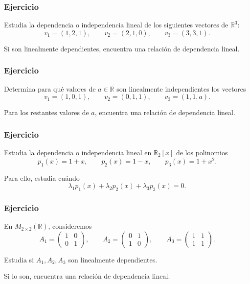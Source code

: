 \begin{frame}
    \frametitle{Ejercicio}

    Estudia la dependencia o independencia lineal de los siguientes vectores
    de \(\mathbb{R}^3\):
    \[
        v_1=(1,2,1),\qquad
        v_2=(2,1,0),\qquad
        v_3=(3,3,1).
    \]

    Si son linealmente dependientes, encuentra una relación de dependencia
    lineal.
\end{frame}


\begin{frame}
    \frametitle{Ejercicio}

    Determina para qué valores de \(a\in\mathbb{R}\) son linealmente
    independientes los vectores
    \[
        v_1=(1,0,1),\qquad
        v_2=(0,1,1),\qquad
        v_3=(1,1,a).
    \]

    Para los restantes valores de \(a\), encuentra una relación de
    dependencia lineal.
\end{frame}


\begin{frame}
    \frametitle{Ejercicio}

    Estudia la dependencia o independencia lineal en \(\mathbb{R}_2[x]\)
    de los polinomios
    \[
        p_1(x)=1+x,
        \qquad
        p_2(x)=1-x,
        \qquad
        p_3(x)=1+x^2.
    \]

    \medskip

    Para ello, estudia cuándo
    \[
        \lambda_1p_1(x)+
        \lambda_2p_2(x)+
        \lambda_3p_3(x)=0.
    \]
\end{frame}


\begin{frame}
    \frametitle{Ejercicio}

    En \(M_{2\times2}(\mathbb{R})\), consideremos
    \[
        A_1=
        \begin{pmatrix}
            1&0\\
            0&1
        \end{pmatrix},
        \qquad
        A_2=
        \begin{pmatrix}
            0&1\\
            1&0
        \end{pmatrix},
        \qquad
        A_3=
        \begin{pmatrix}
            1&1\\
            1&1
        \end{pmatrix}.
    \]

    Estudia si \(A_1,A_2,A_3\) son linealmente dependientes.

    Si lo son, encuentra una relación de dependencia lineal.
\end{frame}
